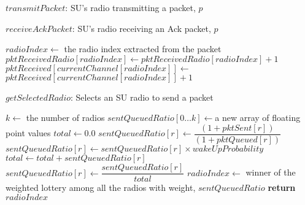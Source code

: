 \begin{algorithm}
\caption{$\mathit{transmitPacket}$: SU's radio transmitting a packet, $p$}
\label{alg:transmitPacket}
\end{algorithm}
\begin{algorithm}
\caption{$\mathit{receiveAckPacket}$: SU's radio receiving an Ack packet, $p$}
\label{alg:receivePacket}
\begin{algorithmic}[1]
\State $\mathit{radioIndex} \gets $ the radio index extracted from the packet
\State $\mathit{pktReceivedRadio}[\mathit{radioIndex}]\gets$\Statex$ \mathit{pktReceivedRadio}[\mathit{radioIndex}]+1$
\State $\mathit{pktReceived}[\mathit{currentChannel}[\mathit{radioIndex}]]\gets$\Statex$ \mathit{pktReceived}[\mathit{currentChannel}[\mathit{radioIndex}]]+1$
\EndIf
\EndFunction
\end{algorithmic}
\end{algorithm}

\begin{algorithm}
\caption{$\mathit{getSelectedRadio}$: Selects an SU radio to send a packet}
\label{alg:getSelectedRadio}
\begin{algorithmic}[1]
\State $k \gets$ the number of radios
\State $\mathit{sentQueuedRatio} [0\ldots k] \gets $a new array of floating point values
\State $\mathit{total} \gets 0.0$
\State $\mathit{sentQueuedRatio}[r] \gets \dfrac{(1+\mathit{pktSent}[\mathit{r}])}{(1+\mathit{pktQueued}[\mathit{r}])}$
\State $\mathit{sentQueuedRatio}[r] \gets$\Statex[2]$ \mathit{sentQueuedRatio}[r] \times \mathit{wakeUpProbability}$
\EndIf
\State $\mathit{total} \gets \mathit{total} + \mathit{sentQueuedRatio}[r]$
\EndFor
{}
\State $\mathit{sentQueuedRatio}[r] \gets \dfrac{\mathit{sentQueuedRatio}[r]}{\mathit{total}}$
\EndFor
\State $\mathit{radioIndex} \gets$ winner of the weighted lottery among all the radios with weight, $\mathit{sentQueuedRatio}$
\State \textbf{return} $\mathit{radioIndex}$
\EndFunction
\end{algorithmic}
\end{algorithm}

